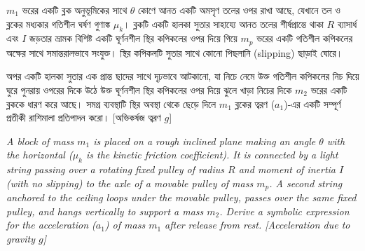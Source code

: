 \documentclass[12pt, a4paper]{article}
\begin{document}
\begin{tcolorbox}[questionbox={প্রশ্ন (Question) 4}]
\noindent
$m_1$ ভরের একটি ব্লক অনুভূমিকের সাথে $\theta$ কোণে আনত একটি অমসৃণ তলের ওপর রাখা আছে, যেখানে তল ও ব্লকের মধ্যকার গতিশীল ঘর্ষণ গুণাঙ্ক $\mu_k$। ব্লকটি একটি হালকা সুতার সাহায্যে আনত তলের শীর্ষপ্রান্তে থাকা $R$ ব্যাসার্ধ এবং $I$ জড়তার ভ্রামক বিশিষ্ট একটি ঘূর্ণনশীল স্থির কপিকলের ওপর দিয়ে গিয়ে $m_p$ ভরের একটি গতিশীল কপিকলের অক্ষের সাথে সমান্তরালভাবে সংযুক্ত। স্থির কপিকলটি সুতার সাথে কোনো পিছলানি (slipping) ছাড়াই ঘোরে। 

\vspace{0.3em}
\noindent
অপর একটি হালকা সুতার এক প্রান্ত ছাদের সাথে দৃঢ়ভাবে আটকানো, যা নিচে নেমে উক্ত গতিশীল কপিকলের নিচ দিয়ে ঘুরে পুনরায় ওপরের দিকে উঠে উক্ত ঘূর্ণনশীল স্থির কপিকলের ওপর দিয়ে ঝুলে খাড়া নিচের দিকে $m_2$ ভরের একটি ব্লককে ধারণ করে আছে। সমগ্র ব্যবস্থাটি স্থির অবস্থা থেকে ছেড়ে দিলে $m_1$ ব্লকের ত্বরণ ($a_1$)-এর একটি সম্পূর্ণ প্রতীকী রাশিমালা প্রতিপাদন করো। [অভিকর্ষজ ত্বরণ $g$]

\vspace{0.8em}
\begin{english}
\noindent\textit{\color{darkgray}
A block of mass $m_1$ is placed on a rough inclined plane making an angle $\theta$ with the horizontal ($\mu_k$ is the kinetic friction coefficient). It is connected by a light string passing over a rotating fixed pulley of radius $R$ and moment of inertia $I$ (with no slipping) to the axle of a movable pulley of mass $m_p$. A second string anchored to the ceiling loops under the movable pulley, passes over the same fixed pulley, and hangs vertically to support a mass $m_2$. Derive a symbolic expression for the acceleration ($a_1$) of mass $m_1$ after release from rest. [Acceleration due to gravity $g$]
}
\end{english}
\end{tcolorbox}
\end{document}

